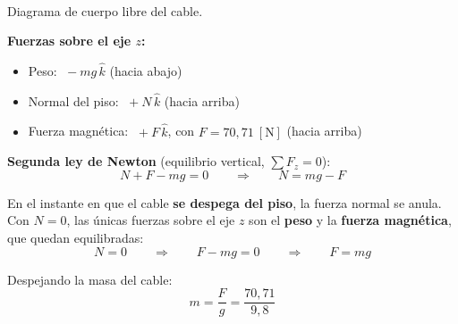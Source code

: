 \documentclass[12pt,letterpaper]{article}
\begin{document}
\noindent
\begin{minipage}[t]{0.34\textwidth}
\centering
\vspace{0pt}
\\[3pt]
{\footnotesize Diagrama de cuerpo libre del cable.}
\end{minipage}%
\hfill
\begin{minipage}[t]{0.62\textwidth}
\vspace{0pt}
\textbf{Fuerzas sobre el eje $z$:}
\begin{itemize}\setlength\itemsep{2pt}
    \item Peso: $\;-mg\,\hat{k}$ \hfill (hacia abajo)
    \item Normal del piso: $\;+N\,\hat{k}$ \hfill (hacia arriba)
    \item Fuerza magn\'etica: $\;+F\,\hat{k}$, \; con $F = 70{,}71\ [\text{N}]$ \hfill (hacia arriba)
\end{itemize}

\smallskip
\textbf{Segunda ley de Newton} (equilibrio vertical, $\sum F_z = 0$):
\[
    N + F - mg = 0
    \qquad\Longrightarrow\qquad
    N = mg - F
\]
\end{minipage}

\bigskip

\noindent En el instante en que el cable \textbf{se despega del piso}, la fuerza normal se anula.
Con $N = 0$, las \'unicas fuerzas sobre el eje $z$ son el \textbf{peso} y la \textbf{fuerza
magn\'etica}, que quedan equilibradas:
\[
    N = 0
    \qquad\Longrightarrow\qquad
    F - mg = 0
    \qquad\Longrightarrow\qquad
    F = mg
\]

\noindent Despejando la masa del cable:
\[
    m = \frac{F}{g} = \frac{70{,}71}{9{,}8}
\]
\end{document}
